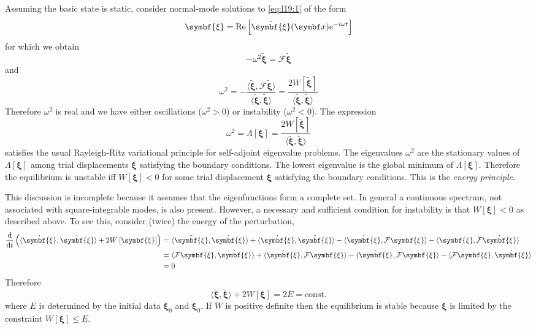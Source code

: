 \documentclass{jknotes}
\newcommand{\disp}{\symbf{\xi}}
\begin{document}
Assuming the basic state is static, consider normal-mode solutions to
\eqref{eq:l19:1} of the form
\begin{equation}
	\disp = \Re\left[ \tilde{\disp}(\x) e^{-i\omega t}\right]
\end{equation}
for which we obtain
\begin{equation}
	-\omega^2 \tilde{\disp} = \mathcal{F} \tilde{\disp}
\end{equation}
and
\begin{equation}
	\omega^2 = -\frac{\langle \tilde{\disp}, \mathcal{F} \tilde{\disp}
	\rangle}{\langle \tilde{\disp}, \tilde{\disp} \rangle} =
	\frac{2W\left[\tilde{\disp}\right]}{\langle \tilde{\disp},
		\tilde{\disp}\rangle}
\end{equation}
Therefore $\omega^2$ is real and we have either oscillations ($\omega^2 > 0$)
or instability ($\omega^2 < 0$). The expression
\begin{equation}
	\omega^2 = \Lambda\left[\disp\right] = 
	\frac{2W\left[\tilde{\disp}\right]}{\langle \tilde{\disp},
		\tilde{\disp}\rangle}
\end{equation}
satisfies the usual Rayleigh-Ritz variational principle for self-adjoint
eigenvalue problems. The eigenvalues $\omega^2$ are the stationary values of
$\Lambda\left[\disp\right]$ among trial displacements $\disp$ satisfying the
boundary conditions. The lowest eigenvalue is the global minimum of
$\Lambda\left[\disp\right]$. Therefore the equilibrium is unstable iff
$W\left[\disp\right] < 0$ for some trial displacement $\disp$ satisfying the
boundary conditions. This is the \emph{energy principle}. 

This discussion is incomplete because it assumes that the eigenfunctions form
a complete set. In general a continuous spectrum, not associated with
square-integrable modes, is also present. However, a necessary and sufficient
condition for instability is that $W\left[\disp\right] < 0$ as described
above. To see this, consider (twice) the energy of the perturbation,
\begin{align}
	\frac{\diffd}{\diffd t} \left( \langle \dot{\disp},\dot{\disp}\rangle +
	2W\left[\disp\right]\right) &= \langle \ddot{\disp},\dot{\disp}\rangle +
	\langle \dot{\disp}, \ddot{\disp}\rangle - \langle \dot{\disp},
	\mathcal{F} \disp \rangle - \langle \disp, \mathcal{F}\dot{\disp}\rangle
	\\
								&= \langle \mathcal{F}\disp, \dot{\disp}\rangle
								+ \langle \dot{\disp},\mathcal{F}\disp\rangle
								- \langle \dot{\disp}, \mathcal{F}\disp
								\rangle - \langle \mathcal{F} \disp,
								\dot{\disp}\rangle \\
								&= 0
\end{align}
Therefore
\begin{equation}
	\langle \dot{\disp},\dot{\disp}\rangle + 2W\left[\disp\right] = 2E =
	\text{const.}
\end{equation}
where $E$ is determined by the initial data $\disp_0$ and $\dot{\disp}_0$. If
$W$ is positive definite then the equilibrium is stable because $\disp$ is
limited by the constraint $W\left[\disp\right] \le E$. 
\end{document}
